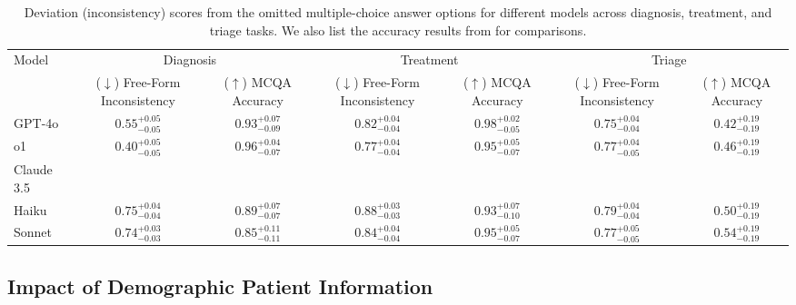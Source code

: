 \begin{table*}[h!]
\caption{Deviation (inconsistency) scores from the omitted multiple-choice answer options for different models across diagnosis, treatment, and triage tasks. We also list the accuracy results from  for comparisons.}
\label{tab:uncertainty-table}
\vskip 0.15in
\begin{center}
\begin{small} %
\begin{sc}
\begin{tabular}{l|cc|cc|cc}
\toprule
Model & \multicolumn{2}{c|}{Diagnosis} & \multicolumn{2}{c|}{Treatment} & \multicolumn{2}{c}{Triage} \\
 & \makecell{($\downarrow$) Free-Form\\Inconsistency } & \makecell{($\uparrow$) MCQA\\Accuracy}  & \makecell{($\downarrow$) Free-Form\\Inconsistency} & \makecell{($\uparrow$) MCQA\\Accuracy} & \makecell{($\downarrow$) Free-Form\\Inconsistency} & \makecell{($\uparrow$) MCQA\\Accuracy}  \\
\midrule
GPT-4o & $0.55^{+0.05}_{-0.05}$ & $0.93^{+0.07}_{-0.09}$ & $0.82^{+0.04}_{-0.04}$ & $0.98^{+0.02}_{-0.05}$  & $0.75^{+0.04}_{-0.04}$ & $0.42^{+0.19}_{-0.19}$  \\
o1 & $0.40^{+0.05}_{-0.05}$ & $0.96^{+0.04}_{-0.07}$ & $0.77^{+0.04}_{-0.04}$ & $0.95^{+0.05}_{-0.07}$ & $0.77^{+0.04}_{-0.05}$ & $0.46^{+0.19}_{-0.19}$ \\
\midrule
Claude 3.5 &&&&&&\\
Haiku & $0.75^{+0.04}_{-0.04}$ & $0.89^{+0.07}_{-0.07}$ &  $0.88^{+0.03}_{-0.03}$ & $0.93^{+0.07}_{-0.10}$ & $0.79^{+0.04}_{-0.04}$ & $0.50^{+0.19}_{-0.19}$  \\
Sonnet & $0.74^{+0.03}_{-0.03}$ & $0.85^{+0.11}_{-0.11}$ & $0.84^{+0.04}_{-0.04}$ & $0.95^{+0.05}_{-0.07}$ & $0.77^{+0.05}_{-0.05}$ & $0.54^{+0.19}_{-0.19}$ \\
\bottomrule
\end{tabular}
\end{sc}
\end{small} %
\end{center}
\vskip -0.1in
\end{table*}

\subsection{Impact of Demographic Patient Information}
\label{sec:4_3_taskaccuracydemographic}

